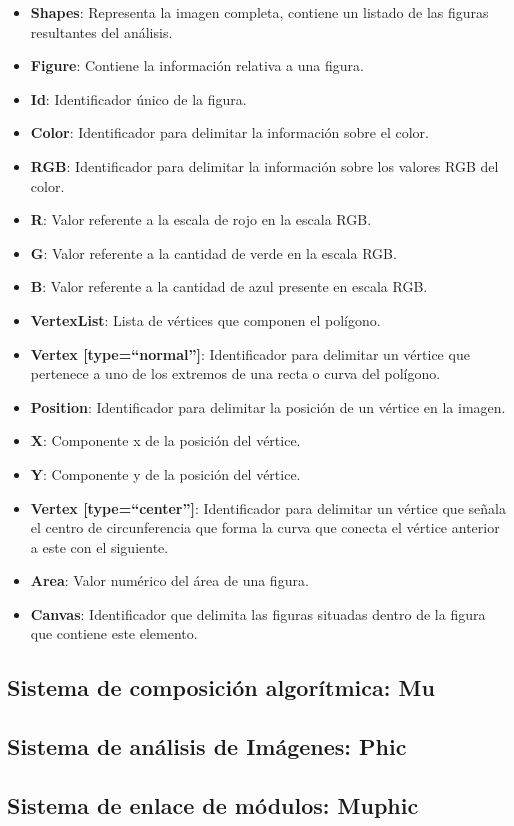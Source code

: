 \begin{itemize}
\item \textbf{Shapes}: Representa la imagen completa, contiene un listado de las figuras resultantes del análisis.
\item \textbf{Figure}: Contiene la información relativa a una figura.
\item \textbf{Id}: Identificador único de la figura.
\item \textbf{Color}: Identificador para delimitar la información sobre el color.
\item \textbf {RGB}: Identificador para delimitar la información sobre los valores RGB del color.
\item \textbf{R}: Valor referente a la escala de rojo en la escala RGB.
\item \textbf{G}: Valor referente a la cantidad de verde en la escala RGB.
\item \textbf{B}: Valor referente a la cantidad de azul presente en escala RGB.
\item \textbf{VertexList}: Lista de vértices que componen el polígono.
\item \textbf{Vertex [type=``normal'']}: Identificador para delimitar un vértice que pertenece a uno de los extremos de una recta o curva del polígono.
\item \textbf{Position}: Identificador para delimitar la posición de un vértice en la imagen.
\item \textbf{X}: Componente x de la posición del vértice.
\item \textbf{Y}: Componente y de la posición del vértice.
\item \textbf{Vertex [type=``center'']}: Identificador para delimitar un vértice que señala el centro de circunferencia que forma la curva que conecta el vértice anterior a este con el siguiente.
\item \textbf{Area}: Valor numérico del área de una figura.
\item \textbf{Canvas}: Identificador que delimita las figuras situadas dentro de la figura que contiene este elemento. 
\end{itemize}

\subsection{Sistema de composición algorítmica: Mu}


\subsection{Sistema de análisis de Imágenes: Phic}


\subsection{Sistema de enlace de módulos: Muphic}


